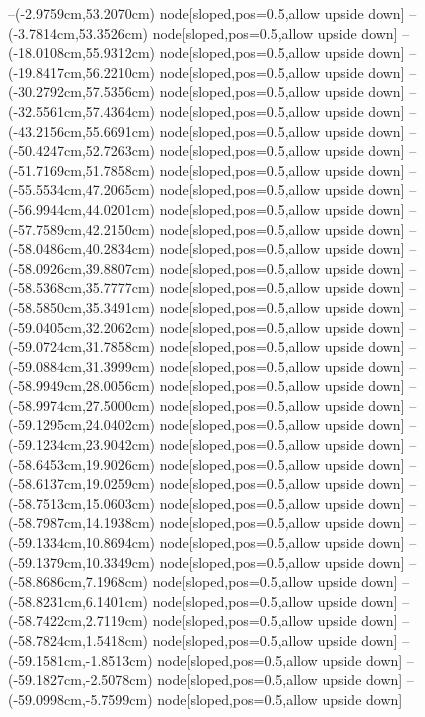 --(-2.9759cm,53.2070cm) node[sloped,pos=0.5,allow upside down]{\arrowIn}
--(-3.7814cm,53.3526cm) node[sloped,pos=0.5,allow upside down]{\arrowIn}
--(-18.0108cm,55.9312cm) node[sloped,pos=0.5,allow upside down]{\ArrowIn}
--(-19.8417cm,56.2210cm) node[sloped,pos=0.5,allow upside down]{\ArrowIn}
--(-30.2792cm,57.5356cm) node[sloped,pos=0.5,allow upside down]{\ArrowIn}
--(-32.5561cm,57.4364cm) node[sloped,pos=0.5,allow upside down]{\ArrowIn}
--(-43.2156cm,55.6691cm) node[sloped,pos=0.5,allow upside down]{\ArrowIn}
--(-50.4247cm,52.7263cm) node[sloped,pos=0.5,allow upside down]{\ArrowIn}
--(-51.7169cm,51.7858cm) node[sloped,pos=0.5,allow upside down]{\ArrowIn}
--(-55.5534cm,47.2065cm) node[sloped,pos=0.5,allow upside down]{\ArrowIn}
--(-56.9944cm,44.0201cm) node[sloped,pos=0.5,allow upside down]{\ArrowIn}
--(-57.7589cm,42.2150cm) node[sloped,pos=0.5,allow upside down]{\ArrowIn}
--(-58.0486cm,40.2834cm) node[sloped,pos=0.5,allow upside down]{\ArrowIn}
--(-58.0926cm,39.8807cm) node[sloped,pos=0.5,allow upside down]{\arrowIn}
--(-58.5368cm,35.7777cm) node[sloped,pos=0.5,allow upside down]{\ArrowIn}
--(-58.5850cm,35.3491cm) node[sloped,pos=0.5,allow upside down]{\arrowIn}
--(-59.0405cm,32.2062cm) node[sloped,pos=0.5,allow upside down]{\ArrowIn}
--(-59.0724cm,31.7858cm) node[sloped,pos=0.5,allow upside down]{\arrowIn}
--(-59.0884cm,31.3999cm) node[sloped,pos=0.5,allow upside down]{\arrowIn}
--(-58.9949cm,28.0056cm) node[sloped,pos=0.5,allow upside down]{\ArrowIn}
--(-58.9974cm,27.5000cm) node[sloped,pos=0.5,allow upside down]{\arrowIn}
--(-59.1295cm,24.0402cm) node[sloped,pos=0.5,allow upside down]{\ArrowIn}
--(-59.1234cm,23.9042cm) node[sloped,pos=0.5,allow upside down]{\arrowIn}
--(-58.6453cm,19.9026cm) node[sloped,pos=0.5,allow upside down]{\ArrowIn}
--(-58.6137cm,19.0259cm) node[sloped,pos=0.5,allow upside down]{\arrowIn}
--(-58.7513cm,15.0603cm) node[sloped,pos=0.5,allow upside down]{\ArrowIn}
--(-58.7987cm,14.1938cm) node[sloped,pos=0.5,allow upside down]{\arrowIn}
--(-59.1334cm,10.8694cm) node[sloped,pos=0.5,allow upside down]{\ArrowIn}
--(-59.1379cm,10.3349cm) node[sloped,pos=0.5,allow upside down]{\arrowIn}
--(-58.8686cm,7.1968cm) node[sloped,pos=0.5,allow upside down]{\ArrowIn}
--(-58.8231cm,6.1401cm) node[sloped,pos=0.5,allow upside down]{\ArrowIn}
--(-58.7422cm,2.7119cm) node[sloped,pos=0.5,allow upside down]{\ArrowIn}
--(-58.7824cm,1.5418cm) node[sloped,pos=0.5,allow upside down]{\ArrowIn}
--(-59.1581cm,-1.8513cm) node[sloped,pos=0.5,allow upside down]{\ArrowIn}
--(-59.1827cm,-2.5078cm) node[sloped,pos=0.5,allow upside down]{\arrowIn}
--(-59.0998cm,-5.7599cm) node[sloped,pos=0.5,allow upside down]{\ArrowIn}
